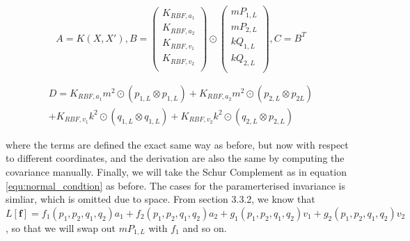 \documentclass{statsmsc}
\begin{document}
$$
A=K(X, X'), 
B=\begin{pmatrix}
    K_{RBF, a_1}\\
    K_{RBF, a_2}\\
    K_{RBF, v_1}\\
    K_{RBF, v_2}\\
\end{pmatrix}\odot
\begin{pmatrix}
mP_{1,L}  \\
mP_{2,L}  \\
kQ_{1,L}  \\
kQ_{2,L}  \\
\end{pmatrix},
C=B^T 
$$

\begin{gather*}
D=K_{RBF,a_1}m^2\odot(p_{1,L}\otimes p_{1,L}) + K_{RBF,a_2}m^2\odot(p_{2,L}\otimes p_{2L})\\+K_{RBF,v_1}k^2\odot(q_{1,L}\otimes q_{1,L})+K_{RBF,v_2}k^2\odot(q_{2,L}\otimes p_{2,L})
\end{gather*}

where the terms are defined the exact same way as before, but now with respect to different coordinates, and the derivation are also the same by computing the covariance manually.
Finally, we will take the Schur Complement as in equation \ref{equ:normal_condtion} as before.
The cases for the paramerterised invariance is simliar, which is omitted due to space.
From section 3.3.2, we know that $L[\mathbf{f}]=f_1(p_1, p_2, q_1, q_2)a_1+f_2(p_1, p_2, q_1, q_2)a_2+g_1(p_1, p_2, q_1, q_2)v_1+g_2(p_1, p_2, q_1, q_2)v_2$, so that we will swap out $mP_{1,L}$ with $f_1$ and so on.
\end{document}
